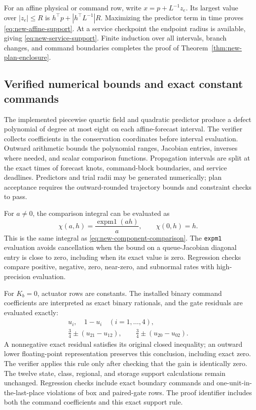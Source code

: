 \documentclass[journal,10pt]{IEEEtran}
\begin{document}
For an affine physical or command row, write
$x=p+L^{-1}z_e$. Its largest value over $|z_e|\le R$ is
$h^\top p+|h^\top L^{-1}|R$. Maximizing the predictor term in time proves
\eqref{eq:new-affine-support}. At a service checkpoint the endpoint radius
is available, giving \eqref{eq:new-service-support}. Finite induction over
all intervals, branch changes, and command boundaries completes the proof
of Theorem~\ref{thm:new-plan-enclosure}.

\subsection{Verified numerical bounds and exact constant commands}

The implemented piecewise quartic field and quadratic predictor produce a
defect polynomial of degree at most eight on each affine-forecast interval.
The verifier collects coefficients in the conservation coordinates before
interval evaluation. Outward arithmetic bounds the polynomial ranges,
Jacobian entries, inverses where needed, and scalar comparison functions.
Propagation intervals are split at the exact times of forecast knots,
command-block boundaries, and service deadlines. Predictors and trial radii
may be generated numerically; plan acceptance requires the outward-rounded
trajectory bounds and constraint checks to pass.

For $a\ne0$, the comparison integral can be evaluated as
\begin{equation}
 \chi(a,h)=\frac{\operatorname{expm1}(ah)}{a},
 \qquad \chi(0,h)=h.
 \label{eq:new-stable-comparison}
\end{equation}
This is the same integral as \eqref{eq:new-component-comparison}.
The \texttt{expm1} evaluation avoids cancellation when the bound on a
queue-Jacobian diagonal entry is close to zero, including when its exact
value is zero. Regression checks compare positive, negative, zero,
near-zero, and subnormal rates with high-precision evaluation.

For $K_b=0$, actuator rows are constants. The installed binary command
coefficients are interpreted as exact binary rationals, and the gate
residuals are evaluated exactly:
\begin{equation}
 \begin{gathered}
 u_i,\quad 1-u_i\quad(i=1,\ldots,4),\\
 \tfrac34\pm(u_{21}-u_{12}),\qquad
 \tfrac34\pm(u_{20}-u_{02}).
 \end{gathered}
 \label{eq:new-exact-actuator-residuals}
\end{equation}
A nonnegative exact residual satisfies its original closed inequality;
an outward lower floating-point representation preserves this conclusion,
including exact zero. The verifier applies this rule only after checking
that the gain is identically zero. The twelve state, class, regional, and
storage support calculations remain unchanged. Regression checks
include exact boundary commands and one-unit-in-the-last-place violations
of box and paired-gate rows. The proof identifier includes both the command
coefficients and this exact support rule.
\end{document}

